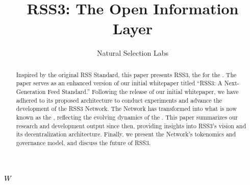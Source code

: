 \documentclass[conference]{IEEEtran}
\begin{document}
\title{RSS3: The Open Information Layer}

\author{Natural Selection Labs}
\maketitle

\tableofcontents

\thispagestyle{plain}
\pagestyle{plain}

\begin{abstract}

    Inspired by the original RSS Standard, this paper presents RSS3, the  for the . The paper serves as an enhanced version of our initial whitepaper titled ``RSS3: A Next-Generation Feed Standard.'' Following the release of our initial whitepaper, we have adhered to its proposed architecture to conduct experiments and advance the development of the RSS3 Network. The Network has transformed into what is now known as the , reflecting the evolving dynamics of the . This paper summarizes our research and development output since then, providing insights into RSS3's vision and its decentralization architecture. Finally, we present the Network's tokenomics and governance model, and discuss the future of RSS3.

\end{abstract}

\ensuremath{\work}













\printglossary[type=main,title=Glossary, toctitle=Glossary]



\end{document}
